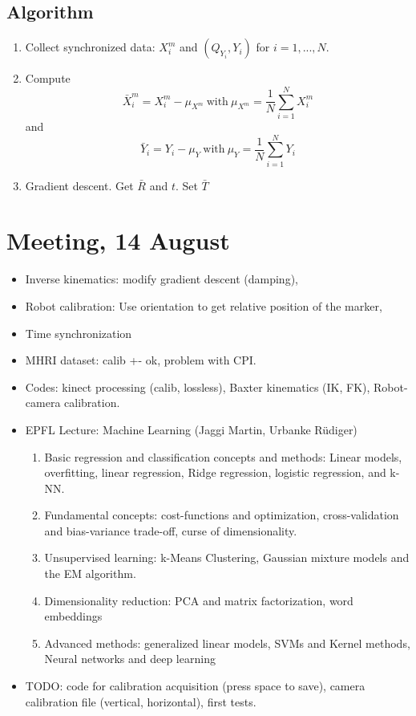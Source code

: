 \documentclass[11pt,a4paper]{article}
\begin{document}
\subsection{Algorithm}
\begin{enumerate}
\item Collect synchronized data: $X_i^m$ and $(Q_{Y_i},Y_i)$ for $i=1,...,N$.
\item Compute 
\begin{equation}
\bar{X}_i^m = X_i^m - \mu_{X^m} ~\text{with}~ \mu_{X^m} = \frac{1}{N}\sum_{i=1}^N X_i^m 
\end{equation}
and
\begin{equation}
\bar{Y}_i = Y_i - \mu_{Y} ~\text{with}~ \mu_{Y} = \frac{1}{N}\sum_{i=1}^N Y_i 
\end{equation}
\item Gradient descent. Get $\bar{R}$ and $t$. Set $\bar{T}$
\end{enumerate}

\section{Meeting, 14 August}
\begin{itemize}
\item Inverse kinematics: modify gradient descent (damping), 
\item Robot calibration: Use orientation to get relative position of the marker,
\item Time synchronization
\item MHRI dataset: calib +- ok, problem with CPI.
\item Codes: kinect processing (calib, lossless), Baxter kinematics (IK, FK), Robot-camera calibration. 
\item EPFL Lecture: Machine Learning (Jaggi Martin, Urbanke Rüdiger)
 \begin{enumerate}
 \item  Basic regression and classification concepts and methods: Linear models, overfitting, linear regression, Ridge regression, logistic regression, and k-NN.
 \item Fundamental concepts: cost-functions and optimization, cross-validation and bias-variance trade-off, curse of dimensionality.
 \item Unsupervised learning: k-Means Clustering, Gaussian mixture models and the EM algorithm.
 \item Dimensionality reduction: PCA and matrix factorization, word embeddings
 \item Advanced methods: generalized linear models, SVMs and Kernel methods, Neural networks and deep learning
 \end{enumerate}
 \item TODO: code for calibration acquisition (press space to save), camera calibration file (vertical, horizontal), first tests.
\end{itemize}

\clearpage


\end{document}
